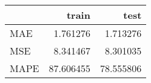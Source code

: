 \begin{tabular}{lrr}
\toprule
{} &      train &       test \\
\midrule
MAE  &   1.761276 &   1.713276 \\
MSE  &   8.341467 &   8.301035 \\
MAPE &  87.606455 &  78.555806 \\
\bottomrule
\end{tabular}
